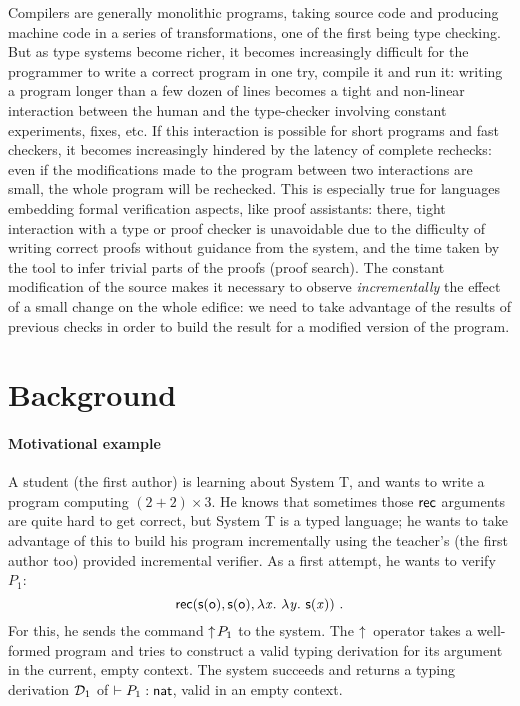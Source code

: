 \documentclass[9pt]{sigplanconf}
\begin{document}
Compilers are generally monolithic programs, taking source code and
producing machine code in a series of transformations, one of the
first being type checking. But as type systems become richer, it
becomes increasingly difficult for the programmer to write a correct
program in one try, compile it and run it: writing a program longer
than a few dozen of lines becomes a tight and non-linear interaction
between the human and the type-checker involving constant experiments,
fixes, etc. If this interaction is possible for short programs and
fast checkers, it becomes increasingly hindered by the latency of
complete rechecks: even if the modifications made to the program
between two interactions are small, the whole program will be
rechecked. This is especially true for languages embedding formal
verification aspects, like proof assistants: there, tight interaction
with a type or proof checker is unavoidable due to the difficulty of
writing correct proofs without guidance from the system, and the time
taken by the tool to infer trivial parts of the proofs (proof
search). The constant modification of the source makes it necessary to
observe \emph{incrementally} the effect of a small change on the whole
edifice: we need to take advantage of the results of previous checks
in order to build the result for a modified version of the program.


\section{Background}

\paragraph{Motivational example}

A student (the first author) is learning about System \sysname T, and
wants to write a program computing $(2+2)\times 3$. He knows that
sometimes those $\text{\textsf{rec}}$ arguments are quite hard to get correct,
but System \sysname T is a typed language; he wants to take advantage
of this to build his program incrementally using the teacher's (the
first author too) provided incremental verifier. As a first attempt,
he wants to verify $P_1$:
$$
\text{\textsf{rec}}({\text{\textsf{s}} ({\text{\textsf{o}}})},{\text{\textsf{s}} ({\text{\textsf{o}}})},{\lambda{\ensuremath{\text{\textit{x}}}}.\ \lambda{\ensuremath{\text{\textit{y}}}}.\  \text{\textsf{s}} ({\text{\textit{x}}})})\ \text{.}
$$
For this, he sends the command $\uparrow\!{P_1}$ to the system. The
$\uparrow\!{}$ operator takes a well-formed program and tries to construct
a valid typing derivation for its argument in the current, empty
context. The system succeeds and returns a typing derivation $\mathcal D_1$
of \/ $\vdash P_1 : \text{\textsf{nat}}$, valid in an empty context.
\end{document}
